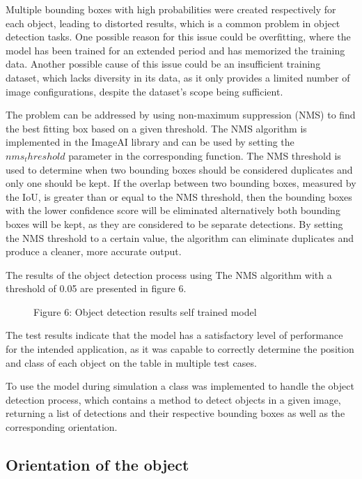 Multiple bounding boxes with high probabilities were created respectively for each object, leading to distorted results, which is a common problem in object detection tasks. One possible reason for this issue could be overfitting, where the model has been trained for an extended period and has memorized the training data. Another possible cause of this issue could be an insufficient training dataset, which lacks diversity in its data, as it only provides a limited number of image configurations, despite the dataset's scope being sufficient.

The problem can be addressed by using non-maximum suppression (NMS) to find the best fitting box based on a given threshold. The NMS algorithm is implemented in the ImageAI library and can be used by setting the \(nms_threshold\) parameter in the corresponding function. The NMS threshold is used to determine when two bounding boxes should be considered duplicates and only one should be kept. If the overlap between two bounding boxes, measured by the IoU, is greater than or equal to the NMS threshold, then  the bounding boxes with the lower confidence score will be eliminated alternatively both bounding boxes will be kept, as they are considered to be separate detections. By setting the NMS threshold to a certain value, the algorithm can eliminate duplicates and produce a cleaner, more accurate output. 

The results of the object detection process using The NMS algorithm with a threshold of 0.05 are presented in figure 6.

\begin{figure}[!h]
    \centering
    \caption{Figure 6: Object detection results self trained model }
\end{figure}

The test results indicate that the model has a satisfactory level of performance for the intended application, as it was capable to correctly determine the position and class of each object on the table in multiple test cases. 

To use the model during simulation a class was implemented to handle the object detection process, which contains a method to detect objects in a given image, returning a list of detections and their respective bounding boxes as well as the corresponding orientation.

\subsection{Orientation of the object}

